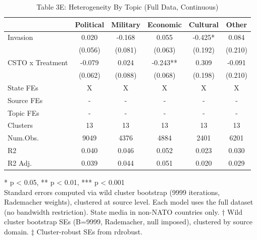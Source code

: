 \begin{table}[!t]
\caption{Table 3E: Heterogeneity By Topic (Full Data, Continuous)} 
\fontsize{12.0pt}{14.4pt}\selectfont
\begin{tabular*}{\linewidth}{@{\extracolsep{\fill}}lccccc}
\toprule
  & Political & Military & Economic & Cultural & Other \\ 
\midrule\addlinespace[2.5pt]
Invasion & 0.020 & -0.168 & 0.055 & -0.425* & 0.084 \\ 
 & (0.056) & (0.081) & (0.063) & (0.192) & (0.210) \\ 
CSTO x Treatment & -0.079 & 0.024 & -0.243** & 0.309 & -0.091 \\ 
{} & {(0.062)} & {(0.088)} & {(0.068)} & {(0.198)} & {(0.210)} \\ 
State FEs & X & X & X & X & X \\ 
Source FEs & - & - & - & - & - \\ 
Topic FEs & - & - & - & - & - \\ 
Clusters & 13 & 13 & 13 & 13 & 13 \\ 
Num.Obs. & 9049 & 4376 & 4884 & 2401 & 6201 \\ 
R2 & 0.040 & 0.046 & 0.052 & 0.023 & 0.030 \\ 
R2 Adj. & 0.039 & 0.044 & 0.051 & 0.020 & 0.029 \\ 
\bottomrule
\end{tabular*}
\begin{minipage}{\linewidth}
* p < 0.05, ** p < 0.01, *** p < 0.001\\
Standard errors computed via wild cluster bootstrap (9999 iterations, Rademacher
weights), clustered at source level. Each model uses the full dataset (no
bandwidth restriction). State media in non-NATO countries only. † Wild cluster
bootstrap SEs (B=9999, Rademacher, null imposed), clustered by source domain. ‡
Cluster-robust SEs from rdrobust.\\
\end{minipage}
\end{table}

